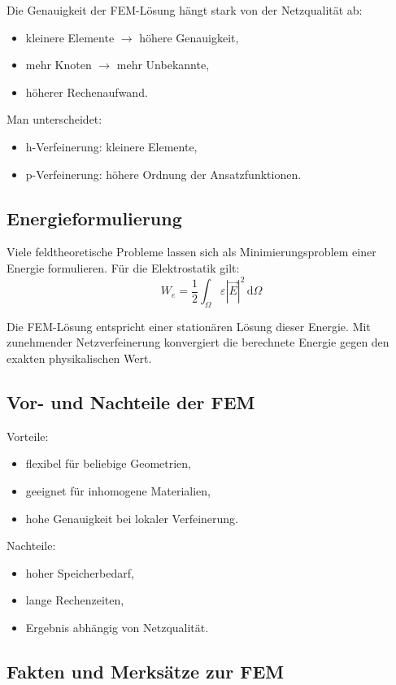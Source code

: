 \documentclass[a4paper]{article}
\begin{document}
Die Genauigkeit der FEM-Lösung hängt stark von der Netzqualität ab:
\begin{itemize}
    \item kleinere Elemente $\rightarrow$ höhere Genauigkeit,
    \item mehr Knoten $\rightarrow$ mehr Unbekannte,
    \item höherer Rechenaufwand.
\end{itemize}

Man unterscheidet:
\begin{itemize}
    \item h-Verfeinerung: kleinere Elemente,
    \item p-Verfeinerung: höhere Ordnung der Ansatzfunktionen.
\end{itemize}

\subsection{Energieformulierung}

Viele feldtheoretische Probleme lassen sich als Minimierungsproblem einer Energie formulieren. Für die Elektrostatik gilt:
\[
W_e = \frac{1}{2} \int_{\Omega} \varepsilon |\vec{E}|^2 \, \mathrm{d}\Omega
\]

Die FEM-Lösung entspricht einer stationären Lösung dieser Energie. Mit zunehmender Netzverfeinerung konvergiert die berechnete Energie gegen den exakten physikalischen Wert.

\subsection{Vor- und Nachteile der FEM}

Vorteile:
\begin{itemize}
    \item flexibel für beliebige Geometrien,
    \item geeignet für inhomogene Materialien,
    \item hohe Genauigkeit bei lokaler Verfeinerung.
\end{itemize}

Nachteile:
\begin{itemize}
    \item hoher Speicherbedarf,
    \item lange Rechenzeiten,
    \item Ergebnis abhängig von Netzqualität.
\end{itemize}
\subsection{Fakten und Merks\"atze zur FEM}
\end{document}
